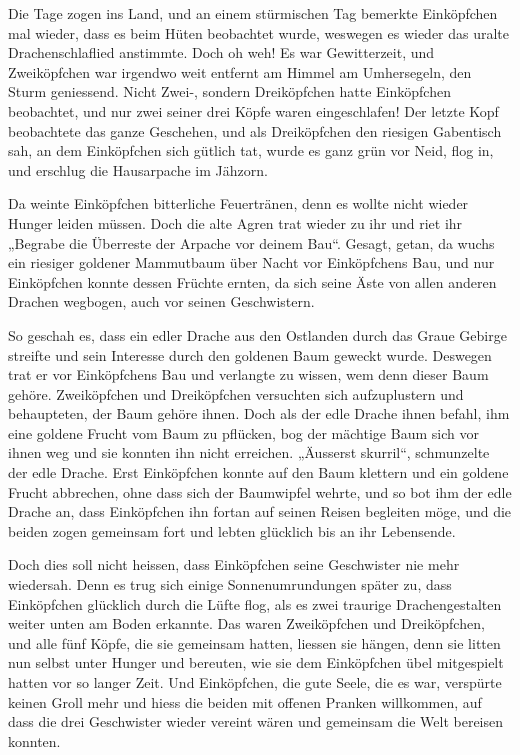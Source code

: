 \documentclass[10pt, a4paper, oneside]{book}
\begin{document}
Die Tage zogen ins Land, und an einem stürmischen Tag bemerkte Einköpfchen mal wieder, dass es beim Hüten beobachtet wurde, weswegen es wieder das uralte Drachenschlaflied anstimmte. Doch oh weh! Es war Gewitterzeit, und Zweiköpfchen war irgendwo weit entfernt am Himmel am Umhersegeln, den Sturm geniessend. Nicht Zwei-, sondern Dreiköpfchen hatte Einköpfchen beobachtet, und nur zwei seiner drei Köpfe waren eingeschlafen! Der letzte Kopf beobachtete das ganze Geschehen, und als Dreiköpfchen den riesigen Gabentisch sah, an dem Einköpfchen sich gütlich tat, wurde es ganz grün vor Neid, flog in, und erschlug die Hausarpache im Jähzorn.



Da weinte Einköpfchen bitterliche Feuertränen, denn es wollte nicht wieder Hunger leiden müssen. Doch die alte Agren trat wieder zu ihr und riet ihr „Begrabe die Überreste der Arpache vor deinem Bau“. Gesagt, getan, da wuchs ein riesiger goldener Mammutbaum über Nacht vor Einköpfchens Bau, und nur Einköpfchen konnte dessen Früchte ernten, da sich seine Äste von allen anderen Drachen wegbogen, auch vor seinen Geschwistern.



So geschah es, dass ein edler Drache aus den Ostlanden durch das Graue Gebirge streifte und sein Interesse durch den goldenen Baum geweckt wurde. Deswegen trat er vor Einköpfchens Bau und verlangte zu wissen, wem denn dieser Baum gehöre. Zweiköpfchen und Dreiköpfchen versuchten sich aufzuplustern und behaupteten, der Baum gehöre ihnen. Doch als der edle Drache ihnen befahl, ihm eine goldene Frucht vom Baum zu pflücken, bog der mächtige Baum sich vor ihnen weg und sie konnten ihn nicht erreichen. „Äusserst skurril“, schmunzelte der edle Drache. Erst Einköpfchen konnte auf den Baum klettern und ein goldene Frucht abbrechen, ohne dass sich der Baumwipfel wehrte, und so bot ihm der edle Drache an, dass Einköpfchen ihn fortan auf seinen Reisen begleiten möge, und die beiden zogen gemeinsam fort und lebten glücklich bis an ihr Lebensende.



Doch dies soll nicht heissen, dass Einköpfchen seine Geschwister nie mehr wiedersah. Denn es trug sich einige Sonnenumrundungen später zu, dass Einköpfchen glücklich durch die Lüfte flog, als es zwei traurige Drachengestalten weiter unten am Boden erkannte. Das waren Zweiköpfchen und Dreiköpfchen, und alle fünf Köpfe, die sie gemeinsam hatten, liessen sie hängen, denn sie litten nun selbst unter Hunger und bereuten, wie sie dem Einköpfchen übel mitgespielt hatten vor so langer Zeit. Und Einköpfchen, die gute Seele, die es war, verspürte keinen Groll mehr und hiess die beiden mit offenen Pranken willkommen, auf dass die drei Geschwister wieder vereint wären und gemeinsam die Welt bereisen konnten.
\end{document}
